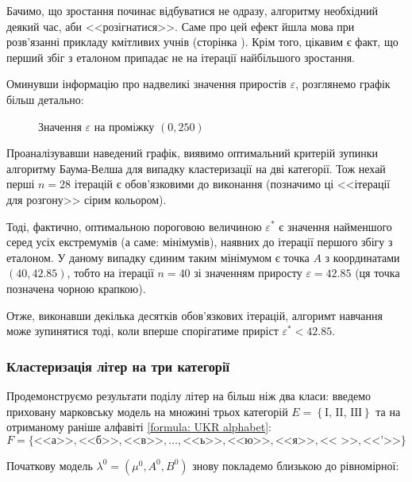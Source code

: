 Бачимо, що зростання починає відбуватися не одразу, алгоритму необхідний деякий час, аби <<розігнатися>>. Саме про цей ефект йшла мова при розв'язанні прикладу кмітливих учнів (сторінка \pageref{code: reestimation}). Крім того, цікавим є факт, що перший збіг з еталоном припадає не на ітерації найбільшого зростання. 

Оминувши інформацію про надвеликі значення приростів $\varepsilon$, розглянемо графік більш детально:
\begin{figure}[H]
    \vspace{-0.8cm}
    \caption{Значення $\varepsilon$ на проміжку $(0,250)$}
    \label{figure: II epsilon (0,250)}
\end{figure}

\newpage
Проаналізувавши наведений графік, виявимо оптимальний критерій зупинки алгоритму Баума-Велша для випадку кластеризації на дві категорії. Тож нехай перші $n=28$ ітерацій є обов'язковими до виконання (позначимо ці <<ітерації для розгону>> сірим кольором). 

Тоді, фактично, оптимальною пороговою величиною $\varepsilon^*$ є значення найменшого серед усіх екстремумів (а саме: мінімумів), наявних до ітерації першого збігу з еталоном. У даному випадку єдиним таким мінімумом є точка $A$ з координатами $(40, 42.85)$, тобто на ітерації $n=40$ зі значенням приросту $\varepsilon=42.85$ (ця точка позначена чорною крапкою). 

Отже, виконавши декілька десятків обов'язкових ітерацій, алгоримт навчання може зупинятися тоді, коли вперше спорігатиме приріст $\varepsilon^*<42.85$. 

\subsubsection{Кластеризація літер на три категорії}
\label{section: III classes}

Продемонструємо результати поділу літер на більш ніж два класи: введемо приховану марковську модель на множині трьох категорій $E=\left\{\text{I},\, \text{II},\, \text{IIІ}\right\}$ та на отриманому раніше алфавіті \eqref{formula: UKR alphabet}:
\begin{equation*}
    F=\{\text{<<а>>},\text{<<б>>},\text{<<в>>},\ldots,\text{<<ь>>},\text{<<ю>>},\text{<<я>>},\text{<< >>},\text{<<'>>}\}
\end{equation*}

Початкову модель $\lambda^0=(\mu^0,A^0,B^0)$ знову покладемо близькою до рівномірної:


